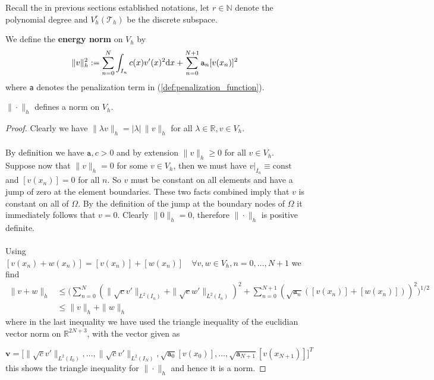 \medskip
Recall the in previous sections established notations, let $r\in \mathbb{N}$ denote the polynomial
degree and $V_h^r(\mathcal{T}_h)$ be the discrete subspace.
\begin{definition}
	We define the \textbf{energy norm} on $V_h$ by
	\begin{equation}
		\label{def:energy_norm}
		\|v\|_h^2 := \sum_{n=0}^{N} \int_{I_n} c(x)v'(x)^2\text{d}x + \sum_{n=0}^{N+1}{\normalfont\texttt{a}_n}[v(x_n)]^2
	\end{equation}
	where {\normalfont\texttt{a}} denotes the penalization term in (\ref{def:penalization_function}).
\end{definition}
\begin{lemma}
	\label{lemma:energy_norm_is_norm}
	$\|\cdot\|_h$ defines a norm on $V_h$.
\end{lemma}
\begin{proof}
	Clearly we have $\|\lambda v\|_h =|\lambda|\, \|v\|_h$ for all $\lambda \in \mathbb{R}, v\in V_h$. \\ \\
	By definition we have $\texttt{a}, c>0$ and by extension $\|v\|_h \geq 0$ for all
	$v\in V_h$. Suppose now that $\|v\|_h = 0$ for some $v\in V_h$, then we must have $v|_{I_n} \equiv \text{const}$
	and $[v(x_n)] = 0$ for all $n$. So $v$ must be constant on all elements and have a jump of zero at the element boundaries.
	These two facts combined imply that $v$ is constant on all of $\Omega$. By the definition of the jump
	at the boundary nodes of $\Omega$ it immediately follows that $v=0$. Clearly
	$\|0\|_h=0$, therefore $\|\cdot\|_h$ is positive definite. \\ \\
	Using $[v(x_n) + w(x_n)] = [v(x_n)] + [w(x_n)] \quad \forall v,w \in V_h, n = 0,\ldots,N+1$ we find
	\begin{align*}
		\|v+w\|_h & \leq \Big(\sum_{n=0}^{N} (\|\sqrt{c}v'\|_{L^2(I_n)}+\|\sqrt{c}w'\|_{L^2(I_n)})^2 +
		\sum_{n=0}^{N+1} (\sqrt{\texttt{a}_n}([v(x_n)] + [w(x_n)]))^2\Big)^{1/2}                       \\
		          & \leq \|v\|_h + \|w\|_h
	\end{align*}
	where in the last inequality we have used the triangle inequality of the euclidian vector norm on $\mathbb{R}^{2N+3}$, with the vector given
	as

	\[
		\textbf{v} = \big[\|\sqrt{c}v'\|_{L^2(I_0)},\ldots,\|\sqrt{c}v'\|_{L^2(I_N)}, \sqrt{\texttt{a}_0}[v(x_0)],\ldots,\sqrt{\texttt{a}_{N+1}}[v(x_{N+1})]\big]^T
	\]
	this shows the triangle inequality for $\|\cdot\|_h$ and hence it is a norm.
\end{proof}

